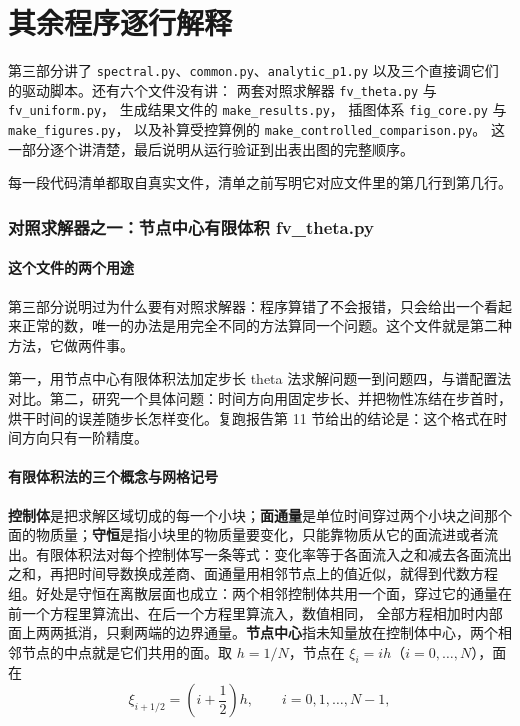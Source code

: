\part{其余程序逐行解释}

第三部分讲了 \texttt{spectral.py}、\texttt{common.py}、\texttt{analytic\_p1.py}
以及三个直接调它们的驱动脚本。还有六个文件没有讲：
两套对照求解器 \texttt{fv\_theta.py} 与 \texttt{fv\_uniform.py}，
生成结果文件的 \texttt{make\_results.py}，
插图体系 \texttt{fig\_core.py} 与 \texttt{make\_figures.py}，
以及补算受控算例的 \texttt{make\_controlled\_comparison.py}。
这一部分逐个讲清楚，最后说明从运行验证到出表出图的完整顺序。

每一段代码清单都取自真实文件，清单之前写明它对应文件里的第几行到第几行。

\section{对照求解器之一：节点中心有限体积 fv\_theta.py}

\subsection{这个文件的两个用途}

第三部分说明过为什么要有对照求解器：程序算错了不会报错，只会给出一个看起来正常的数，唯一的办法是用完全不同的方法算同一个问题。这个文件就是第二种方法，它做两件事。

第一，用节点中心有限体积法加定步长 theta 法求解问题一到问题四，与谱配置法对比。第二，研究一个具体问题：时间方向用固定步长、并把物性冻结在步首时，烘干时间的误差随步长怎样变化。复跑报告第 11 节给出的结论是：这个格式在时间方向只有一阶精度。

\subsection{有限体积法的三个概念与网格记号}

\textbf{控制体}是把求解区域切成的每一个小块；\textbf{面通量}是单位时间穿过两个小块之间那个面的物质量；\textbf{守恒}是指小块里的物质量要变化，只能靠物质从它的面流进或者流出。有限体积法对每个控制体写一条等式：变化率等于各面流入之和减去各面流出之和，再把时间导数换成差商、面通量用相邻节点上的值近似，就得到代数方程组。好处是守恒在离散层面也成立：两个相邻控制体共用一个面，穿过它的通量在前一个方程里算流出、在后一个方程里算流入，数值相同，
全部方程相加时内部面上两两抵消，只剩两端的边界通量。\textbf{节点中心}指未知量放在控制体中心，两个相邻节点的中点就是它们共用的面。取 $h=1/N$，节点在 $\xi_i=ih$（$i=0,\dots,N$），面在
\begin{equation}
\xi_{i+1/2}=\left(i+\frac12\right)h,\qquad i=0,1,\dots,N-1,
\label{eq:p5-facepos}
\end{equation}

